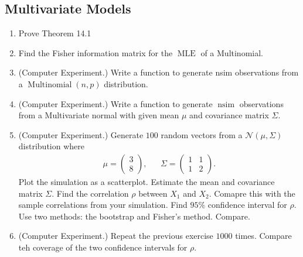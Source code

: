 \documentclass{article}
\newcommand{\MLE}{\operatorname{MLE}}
\begin{document}
\subsection{Multivariate Models}
\begin{enumerate}
	\item Prove Theorem 14.1
	\item Find the Fisher information matrix for the $\MLE$ of a Multinomial.
	\item (Computer Experiment.) Write a function to generate nsim observations from a $\operatorname{Multinomial}(n, p)$ distribution.
	\item (Computer Experiment.) Write a function to generate $\operatorname{nsim}$ observations from a Multivariate normal with given mean $\mu$ and covariance matrix $\Sigma$.
	\item (Computer Experiment.) Generate $100$ random vectors from a $\mathcal{N}(\mu, \Sigma)$ distribution where
	$$
	\begin{aligned}
	\mu = \begin{pmatrix} 3 \\ 8 \end{pmatrix},&&
	\Sigma = \begin{pmatrix}
	1 & 1 \\
	1 & 2
	\end{pmatrix}.
	\end{aligned}
	$$
	Plot the simulation as a scatterplot. Estimate the mean and covariance matrix $\Sigma$. Find the correlation $\rho$ between $X_1$ and $X_2$. Comapre this with the sample correlations from your simulation. Find $95\%$ confidence interval for $\rho$. Use two methods: the bootstrap and Fisher's method. Compare.
	\item (Computer Experiment.) Repeat the previous exercise $1000$ times. Compare teh coverage of the two confidence intervals for $\rho$.
\end{enumerate}
\end{document}
